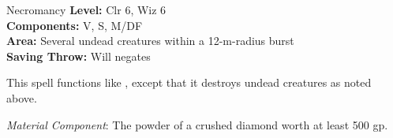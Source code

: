 {Necromancy}
{
	\textbf{Level:}
	Clr 6, Wiz 6\\
	\textbf{Components:}
	V, S, M/DF\\
	\textbf{Area:}
	Several undead creatures within a 12-m-radius burst\\
	\textbf{Saving Throw:}
	Will negates\\
}
{
	This spell functions like , except that it destroys undead creatures as noted above.

	\textit{Material Component}:
	The powder of a crushed diamond worth at least 500 gp.

}
